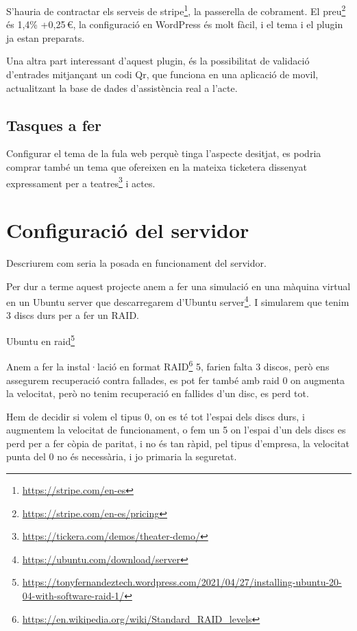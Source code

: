 \documentclass[
  10pt,
]{krantz}
\DeclareRobustCommand{\href}[2]{#2\footnote{\url{#1}}}
\begin{document}
S'hauria de contractar els serveis de \href{https://stripe.com/en-es}{stripe}, la passerella de cobrament. El \href{https://stripe.com/en-es/pricing}{preu} és 1,4\% +0,25\,€, la configuració en WordPress és molt fàcil, i el tema i el plugin ja estan preparats.

Una altra part interessant d'aquest plugin, és la possibilitat de validació d'entrades mitjançant un codi Qr, que funciona en una aplicació de movil, actualitzant la base de dades d'assistència real a l'acte.

\hypertarget{tasques-a-fer}{%
\section{Tasques a fer}\label{tasques-a-fer}}

Configurar el tema de la fula web perquè tinga l'aspecte desitjat, es podria comprar també un tema que ofereixen en la mateixa ticketera dissenyat expressament per a \href{https://tickera.com/demos/theater-demo/}{teatres} i actes.

\hypertarget{configuraciuxf3-del-servidor}{%
\chapter{Configuració del servidor}\label{configuraciuxf3-del-servidor}}

Descriurem com seria la posada en funcionament del servidor.

Per dur a terme aquest projecte anem a fer una simulació en una màquina virtual en un Ubuntu server que descarregarem \href{https://ubuntu.com/download/server}{d'Ubuntu server}. I simularem que tenim 3 discs durs per a fer un RAID.

\href{https://tonyfernandeztech.wordpress.com/2021/04/27/installing-ubuntu-20-04-with-software-raid-1/}{Ubuntu en raid}

Anem a fer la instal·lació en format \href{https://en.wikipedia.org/wiki/Standard_RAID_levels}{RAID} 5, farien falta 3 discos, però ens assegurem recuperació contra fallades, es pot fer també amb raid 0 on augmenta la velocitat, però no tenim recuperació en fallides d'un disc, es perd tot.

Hem de decidir si volem el tipus 0, on es té tot l'espai dels discs durs, i augmentem la velocitat de funcionament, o fem un 5 on l'espai d'un dels discs es perd per a fer còpia de paritat, i no és tan ràpid, pel tipus d'empresa, la velocitat punta del 0 no és necessària, i jo primaria la seguretat.
\end{document}
